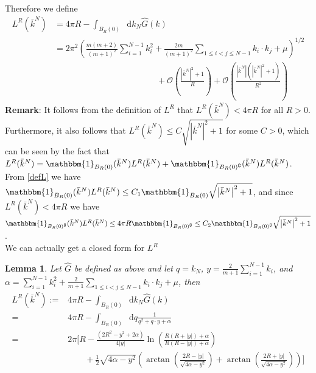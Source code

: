 \documentclass[a4paper,11pt]{article}
\newcommand{\abs}[1]{\left\lvert #1 \right\rvert}
\newcommand*\diff{\mathop{}\!\mathrm{d}}
\newtheorem{lemma}{Lemma}
\numberwithin{equation}{section}
\begin{document}
Therefore we define \begin{equation}\label{defL}
\begin{aligned}
L^R(\bar{k}^N)&=4\pi R-\int_{B_R(0)} \diff k_N \hat{G}(k)\\
&=2\pi^2\left(\frac{m(m+2)}{(m+1)^2}\sum_{i=1}^{N-1}k_i^2+\frac{2m}{(m+1)^2}\sum_{1\leq i<j\leq N-1}k_i\cdot k_j+\mu\right)^{1/2}\\&\qquad\qquad\qquad\qquad\qquad\qquad
+\mathcal{O}\left(\frac{\abs{\bar{k}^N}^2+1}{R}\right)+\mathcal{O}\left(\frac{\abs{\bar{k}^N}(\abs{\bar{k}^N}^2+1)}{R^2}\right)
\end{aligned}
\end{equation}
\textbf{Remark}: It follows from the definition of $ L^R $ that $ L^R(\bar{k}^N)<4\pi R $ for all $ R>0 $. Furthermore, it also follows that $ L^R(\bar{k}^N)\leq C\sqrt{\abs{\bar{k}^N}^2+1} $ for some $ C>0 $, which can be seen by the fact that $ L^R(\bar{k}^N)=\mathbbm{1}_{B_R(0)}(\bar{k}^N)L^R(\bar{k}^N)+\mathbbm{1}_{B_R(0)^\complement}(\bar{k}^N)L^R(\bar{k}^N) $. From \eqref{defL} we have $ \mathbbm{1}_{B_R(0)}(\bar{k}^N)L^R(\bar{k}^N)\leq C_1\mathbbm{1}_{B_R(0)}\sqrt{\abs{\bar{k}^N}^2+1} $, and since $ L^R(\bar{k}^N)<4\pi R $ we have $  \mathbbm{1}_{B_R(0)^\complement}(\bar{k}^N)L^R(\bar{k}^N)\leq4\pi R\mathbbm{1}_{B_R(0)^\complement}\leq C_2\mathbbm{1}_{B_R(0)^\complement}\sqrt{\abs{\bar{k}^N}^2+1} $.\\
We can actually get a closed form for $ L^R $ \begin{lemma} \label{LemmaLEvaluation}
	Let $ \hat{G} $ be defined as above and let $ q=k_N $, $ y=\frac{2}{m+1}\sum_{i=1}^{N-1}k_i $, and $ \alpha=\sum_{i=1}^{N-1}k_i^2+\frac{2}{m+1}\sum_{1\leq i<j\leq N-1}k_i\cdot k_j+\mu $, then
	\begin{equation}
	\begin{aligned}
		L^R(\bar{k}^N):=&4\pi R-\int_{B_R(0)}\diff k_N\hat{G}(k)\\=&
		4\pi R-\int_{B_R(0)}\diff q\frac{1}{q^2+q\cdot y+\alpha}\\
		=&2\pi \Bigg[R-\frac{(2R^2-y^2+2\alpha)}{4\abs{y}}\ln\left(\frac{R(R+\abs{y})+\alpha}{R(R-\abs{y})+\alpha}\right)\\
		&\qquad+\frac{1}{2}\sqrt{4\alpha-y^2}\left(\arctan\left(\frac{2R-\abs{y}}{\sqrt{4\alpha-y^2}}\right)+\arctan\left(\frac{2R+\abs{y}}{\sqrt{4\alpha-y^2}}\right)\right)\Bigg]
		\end{aligned}
	\end{equation}
\end{lemma}
\end{document}
